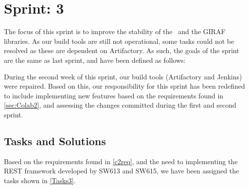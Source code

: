\chapter{Sprint: 3}
The focus of this sprint is to improve the stability of the \lapp\ and the GIRAF
libraries. As our build tools are still not operational, some tasks could not
be resolved as these are dependent on Artifactory. As such, the goals of the
sprint are the same as last sprint, and have been defined as follows:\nl

\nl

\nl 

\nl

During the second week of this sprint, our build tools (Artifactory and Jenkins)
were repaired. Based on this, our responsibility for this sprint has been
redefined to include implementing new features based on the requirements found
in \autoref{sec:Colab2}, and assessing the changes committed during the first
and second sprint. 
 
\section{Tasks and Solutions}
Based on the requirements found in \autoref{c2req}, and the need to
implementing the REST framework developed by SW613 and SW615, we have been
assigned the tasks shown in \autoref{Tasks3}.

